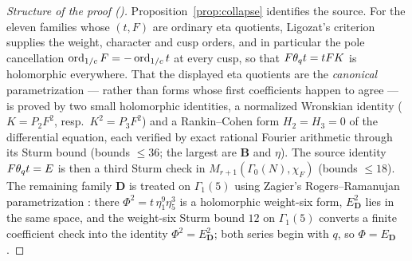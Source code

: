 \begin{proof}[Structure of the proof {\rm(\cite{ProjEisenstein})}]
Proposition~\ref{prop:collapse} identifies the source.  For the eleven
families whose $(t,F)$ are ordinary eta quotients, Ligozat's criterion supplies
the weight, character and cusp orders, and in particular the pole cancellation
$\operatorname{ord}_{1/c}F=-\operatorname{ord}_{1/c}t$ at every cusp, so that $F\theta_q t=tFK$ is holomorphic
everywhere.  That the displayed eta quotients are the \emph{canonical}
parametrization --- rather than forms whose first coefficients happen to agree
--- is proved by two small holomorphic identities, a normalized Wronskian
identity ($K=P_2F^2$, resp.\ $K^2=P_3F^2$) and a Rankin--Cohen form
$H_2=H_3=0$ of the differential equation, each verified by exact rational
Fourier arithmetic through its Sturm bound (bounds $\le36$; the largest are
$\mathbf B$ and $\eta$).  The source identity $F\theta_q t=E$ is then a third
Sturm check in $M_{r+1}(\Gamma_0(N),\chi_F)$ (bounds $\le18$).  The remaining
family $\mathbf D$ is treated on $\Gamma_1(5)$ using Zagier's Rogers--Ramanujan
parametrization \cite{Zagier2009}: there $\Phi^2=t\,\eta_1^9\eta_5^3$ is a
holomorphic weight-six form, $E_{\mathbf D}^2$ lies in the same space, and the
weight-six Sturm bound $12$ on $\Gamma_1(5)$ converts a finite coefficient
check into the identity $\Phi^2=E_{\mathbf D}^2$; both series begin with $q$,
so $\Phi=E_{\mathbf D}$.
\end{proof}

